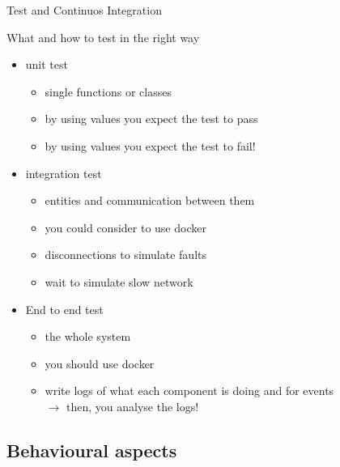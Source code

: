 \documentclass[presentation]{beamer}\mode<presentation>{\usetheme{AMSBolognaFC}}
\begin{document}
\begin{frame}[c,allowframebreaks]{Test and Continuos Integration}
    \begin{block}{What and how to test in the right way}
        \begin{itemize}
            \item unit test
            \begin{itemize}
                \item single functions or classes
                \item by using values you expect the test to pass
                \item by using values you expect the test to \alert{fail!}
            \end{itemize}
            \item integration test
            \begin{itemize}
                \item entities and communication between them
                \item you could consider to use docker
                \item disconnections to simulate faults
                \item wait to simulate slow network
            \end{itemize}
            \item End to end test
            \begin{itemize}
                \item the whole system
                \item you should use docker
                \item write logs of what each component is doing and for events
                \\
                $\rightarrow$ then, you analyse the logs!
            \end{itemize}
        \end{itemize}
    \end{block}
    
\end{frame}


\subsection{Behavioural aspects}
\end{document}
